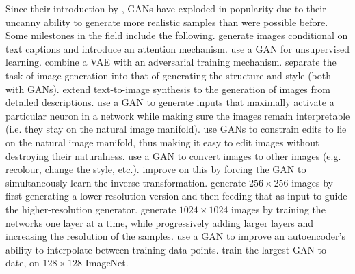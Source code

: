 \documentclass[11pt, a4paper]{book}
\begin{document}
Since their introduction by \citet{gan}, GANs have exploded in popularity due to their uncanny ability to generate more realistic samples than were possible before. Some milestones in the field include the following. \citet{imagefromcaption} generate images conditional on text captions and introduce an attention mechanism. \citet{unsupervisedgan} use a GAN for unsupervised learning. \citet{vaegan} combine a VAE with an adversarial training mechanism. \citet{structurestylegan} separate the task of image generation into that of generating the structure and style (both with GANs). \citet{texttoimagegan} extend text-to-image synthesis to the generation of images from detailed descriptions. \citet{preferredinputs} use a GAN to generate inputs that maximally activate a particular neuron in a network while making sure the images remain interpretable (i.e. they stay on the natural image manifold). \citet{manifoldmanipulation} use GANs to constrain edits to lie on the natural image manifold, thus making it easy to edit images without destroying their naturalness. \citet{imagetoimagegan} use a GAN to convert images to other images (e.g. recolour, change the style, etc.). \citet{cyclegan} improve on this by forcing the GAN to simultaneously learn the inverse transformation. \citet{stackgan} generate $256\times 256$ images by first generating a lower-resolution version and then feeding that as input to guide the higher-resolution generator. \citet{progressivegrowing} generate $1024\times 1024$ images by training the networks one layer at a time, while progressively adding larger layers and increasing the resolution of the samples. \citet{vaeganinterpolation} use a GAN to improve an autoencoder's ability to interpolate between training data points. \citet{largegan} train the largest GAN to date, on $128\times 128$ ImageNet.
\end{document}
